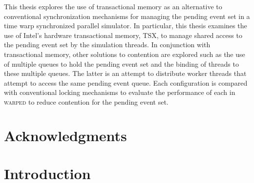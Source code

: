 \documentclass[11pt]{book}
\begin{document}
This thesis explores the use of transactional memory as an alternative to conventional
synchronization mechanisms for managing the pending event set in a time warp synchronized
parallel simulator.  In particular, this thesis examines the use of Intel's hardware
transactional memory, TSX, to manage shared access to the pending event set by the
simulation threads.  In conjunction with transactional memory, other solutions to
contention are explored such as the use of multiple queues to hold the pending event set
and the binding of threads to these multiple queues.  The latter is an attempt to
distribute worker threads that attempt to access the same pending event queue.  Each
configuration is compared with conventional locking mechanisms to evaluate the performance
of each in \textsc{warped} to reduce contention for the pending event set.

\chapter*{Acknowledgments} 



\tableofcontents \markright{ }
\listoffigures \markright{ }
\listoftables \markright{ }

\clearpage
{} \setcounter{page}{1}

\chapter{Introduction}\label{intro} 
\end{document}

